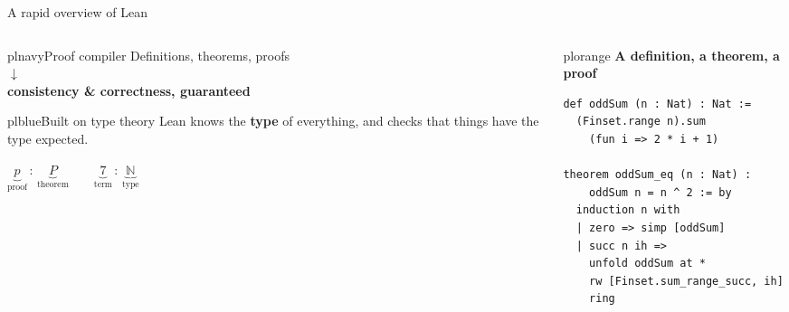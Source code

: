 \documentclass[aspectratio=169,10pt]{beamer}
\newcommand{\plbody}{\small}
\newcommand{\pllabel}{\footnotesize\bfseries}
\begin{document}
\begin{frame}[fragile]{A rapid overview of Lean}
  \vfill
  \begin{columns}[c,onlytextwidth]

    \begin{column}{0.455\textwidth}
      \begin{plcard}[halign=center,top=5pt,bottom=5pt]%
                    {plnavy}{\centering Proof compiler}
        \plbody Definitions, theorems, proofs\\[2pt]
        {\color{plorange}$\downarrow$}\\[2pt]
        \textbf{consistency \& \mbox{correctness}, guaranteed}
      \end{plcard}

      \begin{plcard}[top=5pt,bottom=5pt,before skip=2pt]{plblue}{Built on type theory}
        \plbody
        Lean knows the \textbf{type} of everything, and checks
        that things have the type expected.\par
        \vspace{4pt}
        {\centering\plbody
          $\underbrace{p}_{\text{proof}}\,:\,\underbrace{P}_{\text{theorem}}
           \qquad
           \underbrace{7}_{\text{term}}\,:\,\underbrace{\mathbb{N}}_{\text{type}}$\par}
      \end{plcard}
    \end{column}

    \begin{column}{0.525\textwidth}
      \begin{plplain}[top=3pt,bottom=3pt]{plorange}
        {\pllabel\color{plember}A definition, a theorem, a proof}
        \vspace{3pt}
\begin{lstlisting}
def oddSum (n : Nat) : Nat :=
  (Finset.range n).sum
    (fun i => 2 * i + 1)

theorem oddSum_eq (n : Nat) :
    oddSum n = n ^ 2 := by
  induction n with
  | zero => simp [oddSum]
  | succ n ih =>
    unfold oddSum at *
    rw [Finset.sum_range_succ, ih]
    ring
\end{lstlisting}
      \end{plplain}
    \end{column}

  \end{columns}
  \vfill
\end{frame}
\end{document}
